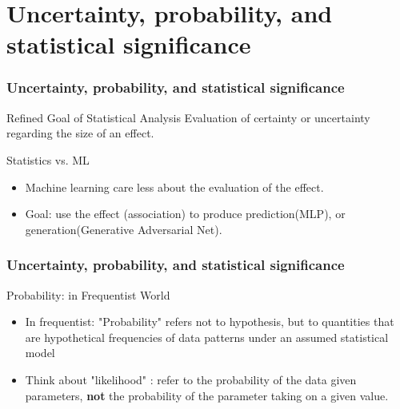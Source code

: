 \documentclass{beamer}
\begin{document}
\section{Uncertainty, probability, and statistical significance}
\begin{frame}
\frametitle{Uncertainty, probability, and statistical significance}

\begin{block}{Refined Goal of Statistical Analysis}
Evaluation of certainty or uncertainty regarding the size of an effect. 
\end{block}
\pause

\begin{block}{Statistics vs. ML}
\begin{itemize}
\item Machine learning care less about the evaluation of the effect. 
\item Goal: use the effect (association) to produce prediction(MLP), or generation(Generative Adversarial Net).
\end{itemize}
\end{block} 
\end{frame}



\begin{frame}
\frametitle{Uncertainty, probability, and statistical significance}

\begin{block}{Probability: in Frequentist World}
\begin{itemize}
\item In frequentist: "Probability" refers not to hypothesis, but to quantities that are hypothetical frequencies of data patterns under an assumed statistical model
\item Think about "likelihood" : refer to the probability of the data given parameters, \textbf{not} the probability of the parameter taking on a given value.
\end{itemize}
\end{block}
\end{frame}
\end{document}
